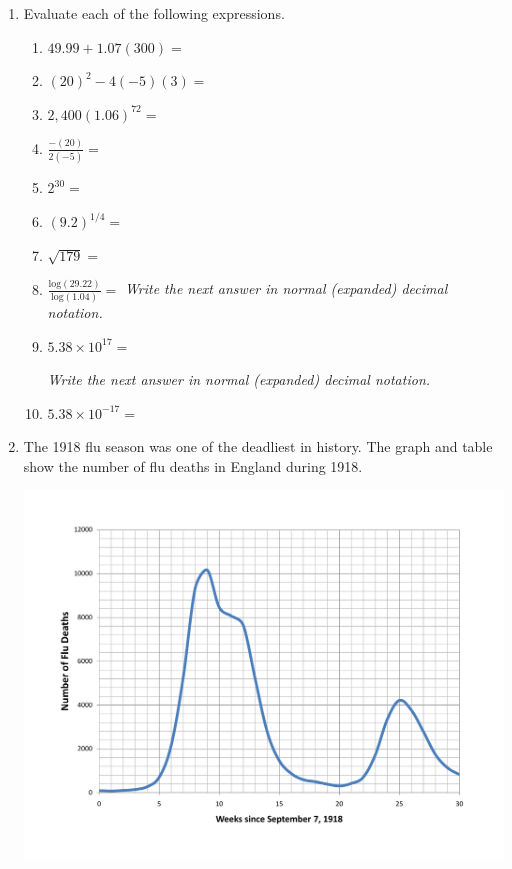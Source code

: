 \documentclass[12pt]{article}
\begin{document}
  \vspace{.2in}
 
 \hrulefill
 
\newpage  %

\begin{enumerate}
\item Evaluate each of the following expressions.

\begin{enumerate}
\item $49.99 + 1.07(300)=$
\vfill
\item $(20)^2-4(-5)(3)=$
\vfill
\item $2,400(1.06)^{72}=$
\vfill
\item $\displaystyle \frac{-(20)}{2(-5)}=$
\vfill
\item $2^{30}=$
\vfill
\item $(9.2)^{1/4}=$
\vfill
\item $\sqrt{179}=$
\vfill
\item $\displaystyle \frac{\text{log}(29.22)}{\text{log}(1.04)}=$
\vfill
\emph{Write the next answer in normal (expanded) decimal notation.}
\item $5.38 \times 10^{17}=$  


\vfill
\emph{Write the next answer in normal (expanded) decimal notation.}
\item $5.38 \times 10^{-17}=$  


\vfill
\end{enumerate}

\newpage  %

\item The 1918 flu season was one of the deadliest in history.  The graph and table show the number of flu deaths in England during 1918.

\begin{center}
\includegraphics [width = .7\textwidth] {EnglandFlu.pdf}
\end{center}


\end{enumerate}
\end{document}
